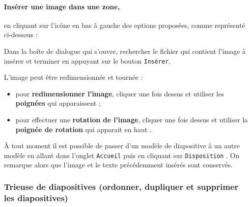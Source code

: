 



\paragraph{Insérer une image dans une zone,}\label{imageZone} en cliquant sur l'icône en bas à gauche des options proposées, comme représenté ci-dessous :


Dans la boîte de dialogue qui s'ouvre, rechercher le fichier qui contient l'image à insérer et terminer en appuyant sur le bouton \texttt{Insérer}.

\vspace{1em}

L'image peut être redimensionnée et tournée :\label{poigneeTourneZoom} 

\begin{itemize}
\item pour \textbf{redimensionner l'image}, cliquer une fois dessus et utiliser les \textbf{poignées} qui apparaissent  ;
\item pour effectuer une \textbf{rotation de l'image}, cliquer une fois dessus et utiliser la \textbf{poignée de rotation} qui apparait en haut .
\end{itemize}


À tout moment il est possible de passer d'un modèle de diapositive à un autre modèle en allant dans l'onglet \texttt{Accueil}  puis en cliquant sur \texttt{Disposition} . On remarque alors que l'image et le texte précédemment insérés sont conservés.




\subsubsection{Trieuse de diapositives (ordonner, dupliquer et supprimer les diapositives)}\label{Presentation1trieuse}

